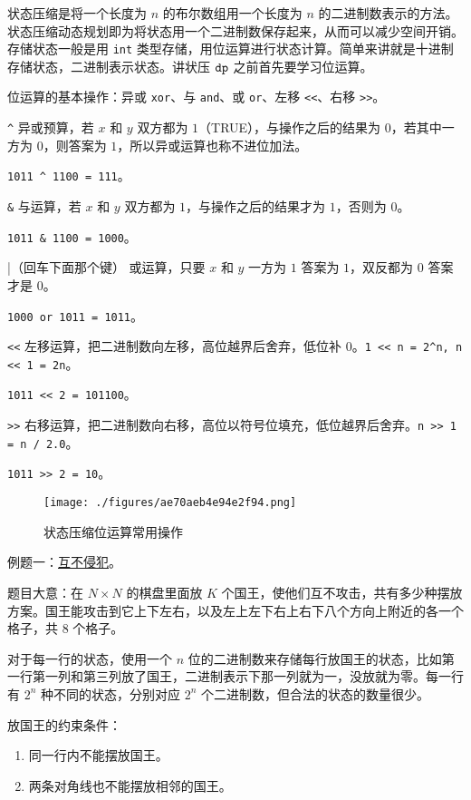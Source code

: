 
状态压缩是将一个长度为 $n$ 的布尔数组用一个长度为 $n$ 的二进制数表示的方法。状态压缩动态规划即为将状态用一个二进制数保存起来，从而可以减少空间开销。存储状态一般是用 \verb|int| 类型存储，用位运算进行状态计算。简单来讲就是十进制存储状态，二进制表示状态。讲状压 $\tt dp$ 之前首先要学习位运算。

位运算的基本操作：异或 \verb|xor|、与 \verb|and|、或 \verb|or|、左移 \verb|<<|、右移 \verb|>>|。

\verb|^| 异或预算，若 $x$ 和 $y$ 双方都为 $1$（TRUE），与操作之后的结果为 $0$，若其中一方为 $0$，则答案为 $1$，所以异或运算也称不进位加法。

\verb|1011 ^ 1100 = 111|。

\verb|&| 与运算，若 $x$ 和 $y$ 双方都为 $1$，与操作之后的结果才为 $1$，否则为 $0$。

\verb|1011 & 1100 = 1000|。

|（回车下面那个键） 或运算，只要 $x$ 和 $y$ 一方为 $1$ 答案为 $1$，双反都为 $0$ 答案才是 $0$。

\verb|1000 or 1011 = 1011|。

\verb|<<| 左移运算，把二进制数向左移，高位越界后舍弃，低位补 $0$。\verb|1 << n = 2^n, n << 1 = 2n|。

\verb|1011 << 2 = 101100|。

\verb|>>| 右移运算，把二进制数向右移，高位以符号位填充，低位越界后舍弃。\verb|n >> 1 = n / 2.0|。

\verb|1011 >> 2 = 10|。

\begin{figure}[ht]
\centering
\texttt{[image: ./figures/ae70aeb4e94e2f94.png]}
\caption{状态压缩位运算常用操作} \label{fig_dp4_1}
\end{figure}

例题一：\href{https://loj.ac/p/2153}{互不侵犯}。

题目大意：在 $N \times N$ 的棋盘里面放 $K$ 个国王，使他们互不攻击，共有多少种摆放方案。国王能攻击到它上下左右，以及左上左下右上右下八个方向上附近的各一个格子，共 $8$ 个格子。

对于每一行的状态，使用一个 $n$ 位的二进制数来存储每行放国王的状态，比如第一行第一列和第三列放了国王，二进制表示下那一列就为一，没放就为零。每一行有 $2^n$ 种不同的状态，分别对应 $2^n$ 个二进制数，但合法的状态的数量很少。

放国王的约束条件：
\begin{enumerate}
\item 同一行内不能摆放国王。
\item 两条对角线也不能摆放相邻的国王。
\end{enumerate}

